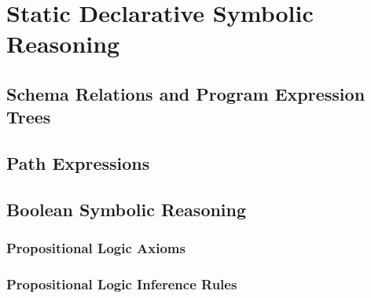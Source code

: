 
\chapter{Static Declarative Symbolic Reasoning}\label{c:main-content}

\section{Schema Relations and Program Expression Trees}

\section{Path Expressions}

\section{Boolean Symbolic Reasoning}

\subsection{Propositional Logic Axioms}

\subsection{Propositional Logic Inference Rules}


